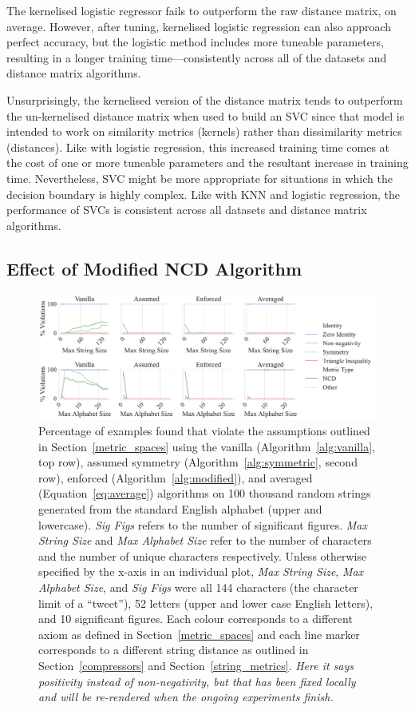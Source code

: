 \documentclass[preprint,12pt]{elsarticle}
\newcommand{\cm}[1]{\textit{{\color{blue}#1}}}
\begin{document}
The kernelised logistic regressor fails to outperform the raw distance matrix, on average.
However, after tuning, kernelised logistic regression can also approach perfect accuracy, but the logistic method includes more tuneable parameters, resulting in a longer training time---consistently across all of the datasets and distance matrix algorithms.

Unsurprisingly, the kernelised version of the distance matrix tends to outperform the un-kernelised distance matrix when used to build an SVC since that model is intended to work on similarity metrics (kernels) rather than dissimilarity metrics (distances).
Like with logistic regression, this increased training time comes at the cost of one or more tuneable parameters and the resultant increase in training time.
Nevertheless, SVC might be more appropriate for situations in which the decision boundary is highly complex.
Like with KNN and logistic regression, the performance of SVCs is consistent across all datasets and distance matrix algorithms.


\subsection{Effect of Modified NCD Algorithm}

\begin{figure}
    \centering
    \includegraphics[width=\textwidth]{images/synthetic_check.pdf}
    \caption{
    Percentage of examples found that violate the assumptions outlined in Section~\ref{metric_spaces} using the vanilla (Algorithm~\ref{alg:vanilla}, top row), assumed symmetry (Algorithm~\ref{alg:symmetric}, second row), enforced (Algorithm~\ref{alg:modified}), and averaged (Equation~\ref{eq:average}) algorithms on 100 thousand random strings generated from the standard English alphabet (upper and lowercase).
    \textit{Sig Figs} refers to the number of significant figures. \textit{Max String Size} and \textit{Max Alphabet Size} refer to the number of characters and the number of unique characters respectively.
    Unless otherwise specified by the x-axis in an individual plot, \textit{Max String Size}, \textit{Max Alphabet Size}, and \textit{Sig Figs} were all 144 characters (the character limit of a ``tweet''), 52 letters (upper and lower case English letters), and 10 significant figures. Each colour corresponds to a different axiom as defined in Section~\ref{metric_spaces} and each line marker corresponds to a different string distance as outlined in Section~\ref{compressors} and Section~\ref{string_metrics}. \cm{Here it says positivity instead of non-negativity, but that has been fixed locally and will be re-rendered when the ongoing experiments finish.}
    }
    \label{fig:synthetic_check}
\end{figure}
\end{document}
